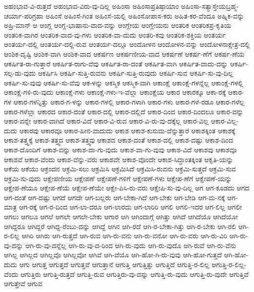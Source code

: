 {ಅಹಂಭಾವ-ವಿ-ರುತ್ತದೆ
ಅಹಂಭಾವ-ವಿರು-ವು-ದಿಲ್ಲ
ಅಹಿಂಸಾ
ಅಹಿಂಸಾಪ್ರತಿಷ್ಠಾಯಾಂ
ಅಹಿಂಸಾ-ಸತ್ಯಾಸ್ತೇಯಬ್ರಹ್ಮ-ಚರ್ಯಾ-ಪರಿಗ್ರಹಾ
ಅಹಿಂಸೆ
ಅಹಿಂಸೆ-ಗಿಂತ
ಅಹಿಂಸೆ-ಯಲ್ಲಿ
ಅಹಿಂಸೋಪಾಸ-ಕರು
ಅಹಿತ-ಕರ-ವೆಂದೂ
ಅಹ್ನಿಕ-ವನ್ನು
ಅಹ್ರಿ-ಮಾನ್
ಆ
ಆಂಗ್ಲ
ಆಂಗ್ಲ-ಭಾಷಾನು-ವಾದ-ವನ್ನು
ಆಂಗ್ಲೇಯ
ಆಂಗ್ಲೇಯನು
ಆಂತರಿಕ
ಆಂತರಿಕಪ್ರ-ಕೃತಿಯ
ಆಂತರಿಕ-ವಾಗಿರ
ಆಂತರಿಕ-ವಾದ-ವು-ಗಳು
ಆಂತರಿಕ-ವಾ-ದುದು
ಆಂತರಿ-ಕವು
ಆಂತರಿಕ-ಶಕ್ತಿಯ
ಆಂತರ್ಯ
ಆಂತರ್ಯ-ದಲ್ಲಿ
ಆಂತರ್ಯ-ದಲ್ಲಿ-ರುವ
ಆಂತರ್ಯ-ದಲ್ಲೂ
ಆಂದೋಳನ
ಆಂದೋಳನ-ವನ್ನು
ಆಂದೋಳನಾಕ್ಷೇತ್ರ-ದಲ್ಲಿ
ಆಂಶಿಕ-ದೃಷ್ಟಿ
ಆಂಶಿಕ-ವಾಗಿ
ಆಂಶಿಕ-ವಾದ
ಆಕರ್ಷಣ
ಆಕರ್ಷಣೀಯ-ವಾದ
ಆಕರ್ಷಣೆ
ಆಕರ್ಷ-ಣೆಗೆ
ಆಕರ್ಷ-ಣೆಯ
ಆಕರ್ಷಿತ-ರಾ-ಗುತ್ತಾರೆ
ಆಕರ್ಷಿತ-ರಾಗು-ವೆವು
ಆಕರ್ಷಿತ-ರಾ-ದಂತೆ
ಆಕರ್ಷಿತ-ವಾಗಿ
ಆಕರ್ಷಿತ-ವಾದು-ದನ್ನು
ಆಕರ್ಷಿ-ಸಲ್ಪ-ಡು-ವುದು
ಆಕರ್ಷಿಸಿ
ಆಕರ್ಷಿ-ಸುತ್ತಿ-ರುವನು
ಆಕರ್ಷಿ-ಸುತ್ತಿ-ರುವುದು
ಆಕರ್ಷಿ-ಸುವ
ಆಕರ್ಷಿ-ಸು-ವು-ದಿಲ್ಲ
ಆಕರ್ಷಿ-ಸು-ವುವು
ಆಕರ್ಷಿ-ಸು-ವೆವು
ಆಕ-ಳನ್ನು
ಆಕಸ್ಮಿಕ
ಆಕಸ್ಮಿಕ-ವಾಗಿ
ಆಕಾಂಕ್ಷೆ
ಆಕಾಂಕ್ಷೆ-ಗಳನ್ನೆಲ್ಲ
ಆಕಾಂಕ್ಷೆ-ಗಳಲ್ಲಿ
ಆಕಾಂಕ್ಷೆ-ಗಳಿ-ರು-ವುದು
ಆಕಾಂಕ್ಷೆ-ಗಳು
ಆಕಾಂಕ್ಷೆ-ಗಳು-ಇ-ವೆಲ್ಲಾ
ಆಕಾಂಕ್ಷೆಯ
ಆಕಾರ
ಆಕಾರಕ್ಕೂ
ಆಕಾ-ರಕ್ಕೆ
ಆಕಾರ-ಗಳ
ಆಕಾರ-ಗಳನ್ನಿತ್ತು
ಆಕಾರ-ಗ-ಳನ್ನು
ಆಕಾರ-ಗಳಲ್ಲಿ
ಆಕಾರ-ಗಳಾಗಿ
ಆಕಾರ-ಗಳು
ಆಕಾರ-ಗಳೆ-ರಡೂ
ಆಕಾರ-ಗಳೆಲ್ಲ
ಆಕಾರ-ಗಳೆಲ್ಲಾ
ಆಕಾರದ
ಆಕಾರ-ದಂತೆ
ಆಕಾರ-ದಲ್ಲಿ
ಆಕಾರ-ದಲ್ಲಿದೆ
ಆಕಾರ-ದಿಂದ
ಆಕಾರ-ದಿಂದಲೂ
ಆಕಾರ-ವನ್ನು
ಆಕಾರ-ವನ್ನೇ
ಆಕಾರ-ವಾಗಿದೆ
ಆಕಾರ-ವಿದೆ
ಆಕಾರ-ವಿ-ರುವ
ಆಕಾರ-ವಿ-ರು-ವು-ದಕ್ಕೆಲ್ಲ
ಆಕಾರ-ವಿಲ್ಲ
ಆಕಾರ-ವಿಲ್ಲ-ದುದು
ಆಕಾರವು
ಆಕಾರವೂ
ಆಕಾರ-ಹೀನ-ವಾದುದು
ಆಕಾಶ
ಆಕಾಶ-ಕುಸುಮ-ವೆನ್ನುತ್ತಾರೆ
ಆಕಾಶಕ್ಕಿಂತ
ಆಕಾಶಕ್ಕೆ
ಆಕಾಶ-ತತ್ತ್ವಕ್ಕೆ
ಆಕಾಶ-ತತ್ತ್ವದ
ಆಕಾಶ-ತತ್ತ್ವವು
ಆಕಾಶದ
ಆಕಾಶ-ದಂತೆ
ಆಕಾಶ-ದಲ್ಲಿ
ಆಕಾಶ-ದಷ್ಟು
ಆಕಾಶ-ದಿಂದ
ಆಕಾಶ-ದೊಂದಿಗೆ
ಆಕಾಶ-ವನ್ನು
ಆಕಾಶ-ವಾ-ಗು-ವುದು
ಆಕಾಶ-ವಾ-ಗು-ವುವು
ಆಕಾಶ-ವಿದೆ
ಆಕಾಶವು
ಆಕಾಶವೂ
ಆಕಾಶವೆ
ಆಕಾಶ-ವೆಂದು
ಆಕಾಶ-ವೆನ್ನು-ವರು
ಆಕಾಶವೇ
ಆಕಾಶ-ವೊಂದೇ
ಆಕಾಶ-ಸಿದ್ಧಾಂತಕ್ಕಿಂತ
ಆಕೃತಿ-ಯನ್ನು
ಆಕೆಯ
ಆಕೆಯು
ಆಕ್ರಂದನ
ಆಕ್ರಮಿ-ಸಲು
ಆಕ್ರಮಿಸಿ
ಆಕ್ರಮಿಸಿದೆ
ಆಕ್ರಮಿಸಿ-ರುವನು
ಆಕ್ರಮಿ-ಸುತ್ತದೆ
ಆಕ್ರಮಿ-ಸುವ
ಆಕ್ರಮಿ-ಸು-ವುದು
ಆಕ್ಷೇಪಣೀಯ
ಆಕ್ಷೇಪಣೆ
ಆಕ್ಷೇಪಣೆ-ಗಳಿಗೆ
ಆಕ್ಷೇಪಣೆ-ಗಳು
ಆಕ್ಷೇಪ-ಣೆಗೆ
ಆಕ್ಷೇಪಣೆ-ಯನ್ನು
ಆಕ್ಷೇಪ-ಣೆಯೂ
ಆಕ್ಷೇಪ-ಣೆಯೆ
ಆಕ್ಷೇಪ-ಣೆಯೇ
ಆಕ್ಷೇ-ಪಿಸಿ-ರು-ವರು
ಆಕ್ಷೇಪಿ-ಸು-ವು-ದಿಲ್ಲ
ಆಗ
ಆಗ-ಕೂಡದು
ಆಗದ
ಆಗ-ದಂತೆ
ಆಗ-ದಷ್ಟು
ಆಗದೆ
ಆಗದೇ
ಆಗ-ಬಲ್ಲರು
ಆಗ-ಬೇಕಾ-ಗಿದೆ
ಆಗ-ಬೇಕು
ಆಗ-ಬೇಡಿ
ಆಗ-ಮ-ನಕ್ಕೆ
ಆಗ-ಮಾತ್ರ
ಆಗ-ರಕ್ಕೆ
ಆಗ-ರ-ದಿಂದ
ಆಗ-ಲಾ-ದರೂ
ಆಗ-ಲಾರದು
ಆಗ-ಲಾರಿರಿ
ಆಗಲಿ
ಆಗಲಿ-ಇದರ
ಆಗ-ಲಿಲ್ಲ
ಆಗಲೀ
ಆಗಲು
ಆಗಲೂ
ಆಗಲೆ
ಆಗಲೇ
ಆಗಲೇ-ಬೇಕು
ಆಗಾರ
ಆಗಿ
ಆಗಿಂದಾಗ್ಗೆ
ಆಗಿತ್ತು
ಆಗಿದೆ
ಆಗಿದೆಯೊ
ಆಗಿದೆಯೋ
ಆಗಿದ್ದರೂ
ಆಗಿದ್ದರೆ
ಆಗಿದ್ದ-ರೆಂಬು-ದನ್ನು
ಆಗಿದ್ದೆ
ಆಗಿನ
ಆಗಿ-ರದೆ
ಆಗಿ-ರ-ಬೇಕಾ-ಗಿತ್ತು
ಆಗಿ-ರ-ಬೇಕು
ಆಗಿ-ರಲಿ
ಆಗಿ-ರ-ಲಿಲ್ಲ
ಆಗಿರಿ
ಆಗಿರು
ಆಗಿ-ರುತ್ತದೆ
ಆಗಿ-ರುವ
ಆಗಿ-ರು-ವನು
ಆಗಿ-ರು-ವನೋ
ಆಗಿ-ರು-ವರು
ಆಗಿ-ರು-ವಿರಿ
ಆಗಿ-ರು-ವು-ದನ್ನು
ಆಗಿ-ರು-ವು-ದನ್ನೆಲ್ಲ
ಆಗಿ-ರು-ವು-ದ-ರಿಂದ
ಆಗಿ-ರು-ವುದು
ಆಗಿ-ರು-ವುದೊ
ಆಗಿ-ರುವೆ
ಆಗಿ-ರು-ವೆನು
ಆಗಿಲ್ಲ
ಆಗಿಲ್ಲದ
ಆಗಿಲ್ಲವೊ
ಆಗಿಲ್ಲವೋ
ಆಗಿವೆ
ಆಗಿ-ವೆಯೊ
ಆಗಿ-ಹೋ-ಗಿ-ರು-ವುವು
ಆಗಿ-ಹೋ-ಗುತ್ತದೆ
ಆಗಿ-ಹೋ-ದುದು
ಆಗು
ಆಗುತ್ತ
ಆಗುತ್ತದೆ
ಆಗುತ್ತವೆ
ಆಗುತ್ತಾನೆ
ಆಗುತ್ತಿ
ಆಗುತ್ತಿತ್ತು
ಆಗುತ್ತಿದೆ
ಆಗುತ್ತಿ-ರ-ಲಿಲ್ಲ
ಆಗುತ್ತಿ-ರ-ಲಿಲ್ಲ-ವೆಂದು
ಆಗುತ್ತಿರು
ಆಗುತ್ತಿ-ರುತ್ತದೆ
ಆಗುತ್ತಿ-ರುವ
ಆಗುತ್ತಿರು-ವು-ದನ್ನು
ಆಗುತ್ತಿ-ರು-ವುದು
ಆಗುತ್ತಿ-ರು-ವುದೇ
ಆಗುತ್ತಿವೆ
ಆಗುತ್ತೇವೆ
ಆಗುವ
}
